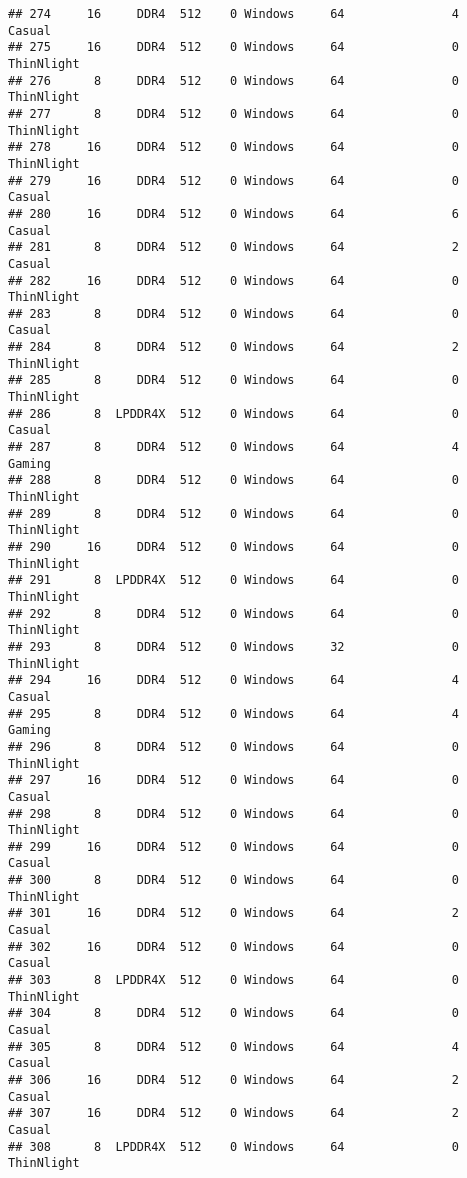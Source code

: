 \documentclass[
]{article}
\begin{document}
\begin{verbatim}
## 274     16     DDR4  512    0 Windows     64               4     Casual
## 275     16     DDR4  512    0 Windows     64               0 ThinNlight
## 276      8     DDR4  512    0 Windows     64               0 ThinNlight
## 277      8     DDR4  512    0 Windows     64               0 ThinNlight
## 278     16     DDR4  512    0 Windows     64               0 ThinNlight
## 279     16     DDR4  512    0 Windows     64               0     Casual
## 280     16     DDR4  512    0 Windows     64               6     Casual
## 281      8     DDR4  512    0 Windows     64               2     Casual
## 282     16     DDR4  512    0 Windows     64               0 ThinNlight
## 283      8     DDR4  512    0 Windows     64               0     Casual
## 284      8     DDR4  512    0 Windows     64               2 ThinNlight
## 285      8     DDR4  512    0 Windows     64               0 ThinNlight
## 286      8  LPDDR4X  512    0 Windows     64               0     Casual
## 287      8     DDR4  512    0 Windows     64               4     Gaming
## 288      8     DDR4  512    0 Windows     64               0 ThinNlight
## 289      8     DDR4  512    0 Windows     64               0 ThinNlight
## 290     16     DDR4  512    0 Windows     64               0 ThinNlight
## 291      8  LPDDR4X  512    0 Windows     64               0 ThinNlight
## 292      8     DDR4  512    0 Windows     64               0 ThinNlight
## 293      8     DDR4  512    0 Windows     32               0 ThinNlight
## 294     16     DDR4  512    0 Windows     64               4     Casual
## 295      8     DDR4  512    0 Windows     64               4     Gaming
## 296      8     DDR4  512    0 Windows     64               0 ThinNlight
## 297     16     DDR4  512    0 Windows     64               0     Casual
## 298      8     DDR4  512    0 Windows     64               0 ThinNlight
## 299     16     DDR4  512    0 Windows     64               0     Casual
## 300      8     DDR4  512    0 Windows     64               0 ThinNlight
## 301     16     DDR4  512    0 Windows     64               2     Casual
## 302     16     DDR4  512    0 Windows     64               0     Casual
## 303      8  LPDDR4X  512    0 Windows     64               0 ThinNlight
## 304      8     DDR4  512    0 Windows     64               0     Casual
## 305      8     DDR4  512    0 Windows     64               4     Casual
## 306     16     DDR4  512    0 Windows     64               2     Casual
## 307     16     DDR4  512    0 Windows     64               2     Casual
## 308      8  LPDDR4X  512    0 Windows     64               0 ThinNlight

\end{verbatim}
\end{document}
